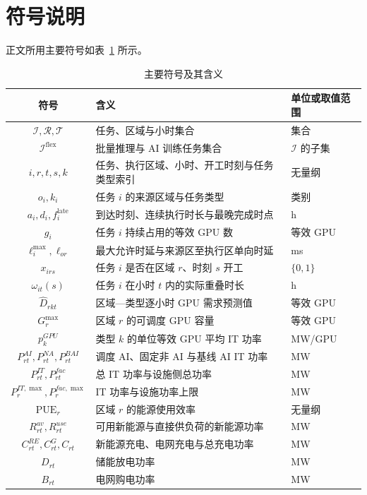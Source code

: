 \section{符号说明}

正文所用主要符号如表~\ref{tab:symbols} 所示。

\begin{table}[htbp]
\centering
\caption{主要符号及其含义}
\label{tab:symbols}
\begin{tabular}{cll}
\toprule
符号 & 含义 & 单位或取值范围 \\
\midrule
$\mathcal I,\mathcal R,\mathcal T$ & 任务、区域与小时集合 & 集合 \\
$\mathcal I^{\mathrm{flex}}$ & 批量推理与 AI 训练任务集合 & $\mathcal I$ 的子集 \\
$i,r,t,s,k$ & 任务、执行区域、小时、开工时刻与任务类型索引 & 无量纲 \\
$o_i,k_i$ & 任务 $i$ 的来源区域与任务类型 & 类别 \\
$a_i,d_i,f_i^{\mathrm{late}}$ & 到达时刻、连续执行时长与最晚完成时点 & h \\
$g_i$ & 任务 $i$ 持续占用的等效 GPU 数 & 等效 GPU \\
$\ell_i^{\max},\ell_{or}$ & 最大允许时延与来源区至执行区单向时延 & ms \\
$x_{irs}$ & 任务 $i$ 是否在区域 $r$、时刻 $s$ 开工 & $\{0,1\}$ \\
$\omega_{it}(s)$ & 任务 $i$ 在小时 $t$ 内的实际重叠时长 & h \\
$\widehat D_{rkt}$ & 区域—类型逐小时 GPU 需求预测值 & 等效 GPU \\
$G_r^{\max}$ & 区域 $r$ 的可调度 GPU 容量 & 等效 GPU \\
$p_k^{GPU}$ & 类型 $k$ 的单位等效 GPU 平均 IT 功率 & MW/GPU \\
$P_{rt}^{AI},P_{rt}^{NA},P_{rt}^{BAI}$ & 调度 AI、固定非 AI 与基线 AI IT 功率 & MW \\
$P_{rt}^{IT},P_{rt}^{fac}$ & 总 IT 功率与设施侧总功率 & MW \\
$P_r^{IT,\max},P_r^{fac,\max}$ & IT 功率与设施功率上限 & MW \\
$\mathrm{PUE}_r$ & 区域 $r$ 的能源使用效率 & 无量纲 \\
$R_{rt}^{av},R_{rt}^{use}$ & 可用新能源与直接供负荷的新能源功率 & MW \\
$C_{rt}^{RE},C_{rt}^{G},C_{rt}$ & 新能源充电、电网充电与总充电功率 & MW \\
$D_{rt}$ & 储能放电功率 & MW \\
$B_{rt}$ & 电网购电功率 & MW \\

\end{tabular}
\end{table}
